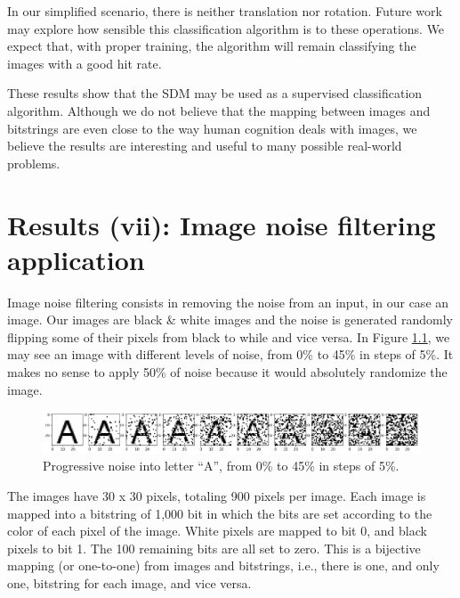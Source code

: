 In our simplified scenario, there is neither translation nor rotation. Future work may explore how sensible this classification algorithm is to these operations. We expect that, with proper training, the algorithm will remain classifying the images with a good hit rate.

These results show that the SDM may be used as a supervised classification algorithm. Although we do not believe that the mapping between images and bitstrings are even close to the way human cognition deals with images, we believe the results are interesting and useful to many possible real-world problems.













\chapter{Results (vii): Image noise filtering application}

\lstset{
    language=Python,
    basicstyle=\small\ttfamily,
}

Image noise filtering consists in removing the noise from an input, in our case an image. Our images are black \& white images and the noise is generated randomly flipping some of their pixels from black to while and vice versa. In Figure \ref{fig-filter-progressive-noise}, we may see an image with different levels of noise, from 0\% to 45\% in steps of 5\%. It makes no sense to apply 50\% of noise because it would absolutely randomize the image.

\begin{figure}[!htb]
\centering\includegraphics[width=\textwidth]{./images02/filter/progressive-noise.png}
\caption{Progressive noise into letter ``A'', from 0\% to 45\% in steps of 5\%.
\label{fig-filter-progressive-noise}}
\end{figure}

The images have 30 x 30 pixels, totaling 900 pixels per image. Each image is mapped into a bitstring of 1,000 bit in which the bits are set according to the color of each pixel of the image. White pixels are mapped to bit 0, and black pixels to bit 1. The 100 remaining bits are all set to zero. This is a bijective mapping (or one-to-one) from images and bitstrings, i.e., there is one, and only one, bitstring for each image, and vice versa.

